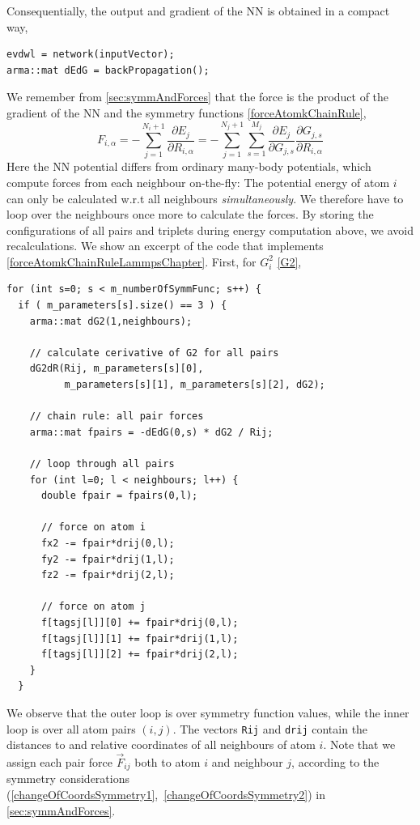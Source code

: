 \documentclass[twoside,english]{uiofysmaster}
\begin{document}
Consequentially, the output and gradient of the NN is obtained in a compact way,
\begin{verbatim}
evdwl = network(inputVector);
arma::mat dEdG = backPropagation();
\end{verbatim}
We remember from \autoref{sec:symmAndForces} that the force is the product of the gradient of the NN and 
the symmetry functions \eqref{forceAtomkChainRule},
\begin{equation}
 F_{i,\alpha} = -\sum_{j=1}^{N_i+1}\frac{\partial E_j}{\partial R_{i,\alpha}} = 
 -\sum_{j=1}^{N_j+1}\sum_{s=1}^{M_j}\frac{\partial E_j}{\partial G_{j,s}}\frac{\partial G_{j,s}}{\partial R_{i,\alpha}}
 \label{forceAtomkChainRuleLammpsChapter}
\end{equation}
Here the NN potential differs from ordinary many-body potentials, which 
compute forces from each neighbour on-the-fly: The potential energy of atom $i$
can only be calculated w.r.t all neighbours \textit{simultaneously}. We therefore have to loop over the neighbours once more
to calculate the forces. By storing the configurations of all pairs and triplets during energy computation above, we
avoid recalculations. We show an excerpt of the code that implements \eqref{forceAtomkChainRuleLammpsChapter}. 
First, for $G_i^2$ \eqref{G2},
\begin{verbatim}
for (int s=0; s < m_numberOfSymmFunc; s++) {
  if ( m_parameters[s].size() == 3 ) {
    arma::mat dG2(1,neighbours);

    // calculate cerivative of G2 for all pairs
    dG2dR(Rij, m_parameters[s][0], 
          m_parameters[s][1], m_parameters[s][2], dG2);

    // chain rule: all pair forces
    arma::mat fpairs = -dEdG(0,s) * dG2 / Rij;

    // loop through all pairs
    for (int l=0; l < neighbours; l++) {
      double fpair = fpairs(0,l);

      // force on atom i
      fx2 -= fpair*drij(0,l);
      fy2 -= fpair*drij(1,l);
      fz2 -= fpair*drij(2,l);

      // force on atom j
      f[tagsj[l]][0] += fpair*drij(0,l);
      f[tagsj[l]][1] += fpair*drij(1,l);
      f[tagsj[l]][2] += fpair*drij(2,l);
    }
  }
\end{verbatim}
We observe that the outer loop is over symmetry function values, while the inner loop is over all atom pairs $(i,j)$.
The vectors \texttt{Rij} and \texttt{drij} contain the distances to and relative coordinates of all neighbours of atom $i$.
Note that we assign each pair force $\vec{F}_{ij}$ both to atom $i$ and neighbour $j$, according to the symmetry 
considerations (\ref{changeOfCoordsSymmetry1},~\ref{changeOfCoordsSymmetry2}) in \autoref{sec:symmAndForces}. 
\end{document}
